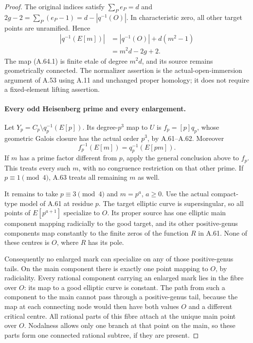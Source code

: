 \begin{proof}
The original indices satisfy
\(\sum_P e_P=d\) and
\(2g-2=\sum_P(e_P-1)=d-|q^{-1}(O)|\).
In characteristic zero, all other target
points are unramified. Hence
\[
 \begin{split}
 |q^{-1}(E[m])|
   &=|q^{-1}(O)|+d(m^2-1)\\
   &=m^2d-2g+2.
 \end{split}                                            \tag{A.64.6}
\]
The map (A.64.1) is finite etale of degree
\(m^2d\), and its source remains geometrically
connected. The normalizer assertion is the
actual-open-immersion argument of A.53 using
A.11 and unchanged proper homology; it does
not require a fixed-element lifting assertion.

\paragraph{Every odd Heisenberg prime and every enlargement.}
Let \(Y_p=C_p\setminus q_p^{-1}(E[p])\).
Its degree-\(p^3\) map to \(U\) is
\(f_p=[p]q_p\), whose geometric Galois closure
has the actual order \(p^3\), by A.61--A.62.
Moreover
\[
                   f_p^{-1}(E[m])=q_p^{-1}(E[pm]).       \tag{A.64.7}
\]
If \(m\) has a prime factor different from
\(p\), apply the general conclusion above to
\(f_p\). This treats every such \(m\), with
no congruence restriction on that other prime.
If \(p\equiv1\pmod4\), A.63 treats all
remaining \(m\) as well.

It remains to take \(p\equiv3\pmod4\) and
\(m=p^a\), \(a\ge0\). Use the actual
compact-type model of A.61 at residue \(p\).
The target elliptic curve is supersingular,
so all points of \(E[p^{a+1}]\) specialize to
\(O\). Its proper source has one elliptic
main component mapping radicially to the
good target, and its other positive-genus
components map constantly to the finite
zeros of the function \(R\) in A.61.
None of these centres is \(O\), where
\(R\) has its pole.

Consequently no enlarged mark can specialize
on any of those positive-genus tails. On the
main component there is exactly one point
mapping to \(O\), by radiciality. Every
rational component carrying an enlarged
mark lies in the fibre over \(O\): its map
to a good elliptic curve is constant. The
path from such a component to the main
cannot pass through a positive-genus tail,
because the map at each connecting node
would then have both values \(O\) and a
different critical centre. All rational
parts of this fibre attach at the unique
main point over \(O\). Nodalness allows
only one branch at that point on the main,
so these parts form one connected rational
subtree, if they are present.


\end{proof}
